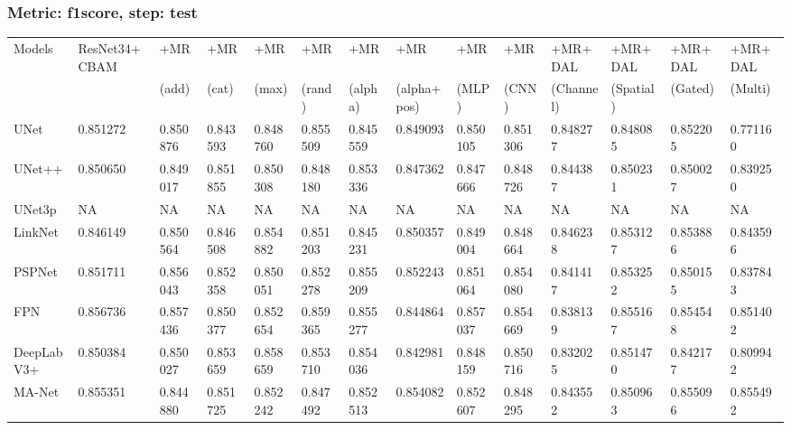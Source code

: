 \documentclass{article}
\begin{document}
\subsubsection{Metric: f1score, step: test}
\begin{tabular}{llllllllllllll}
\toprule
Models & ResNet34+CBAM & +MR  & +MR  & +MR  & +MR  & +MR  & +MR  & +MR  & +MR  & +MR+DAL & +MR+DAL & +MR+DAL & +MR+DAL \\
       &             &  (add) &  (cat) &  (max) &  (rand) &  (alpha) &  (alpha+pos) &  (MLP) &  (CNN) & (Channel) & (Spatial) & (Gated) & (Multi) \\
\midrule
UNet & 0.851272 & 0.850876 & 0.843593 & 0.848760 & 0.855509 & 0.845559 & 0.849093 & 0.850105 & 0.851306 & 0.848277 & 0.848085 & 0.852205 & 0.771160 \\
UNet++ & 0.850650 & 0.849017 & 0.851855 & 0.850308 & 0.848180 & 0.853336 & 0.847362 & 0.847666 & 0.848726 & 0.844387 & 0.850231 & 0.850027 & 0.839250 \\
UNet3p & NA & NA & NA & NA & NA & NA & NA & NA & NA & NA & NA & NA & NA \\
LinkNet & 0.846149 & 0.850564 & 0.846508 & 0.854882 & 0.851203 & 0.845231 & 0.850357 & 0.849004 & 0.848664 & 0.846238 & 0.853127 & 0.853886 & 0.843596 \\
PSPNet & 0.851711 & 0.856043 & 0.852358 & 0.850051 & 0.852278 & 0.855209 & 0.852243 & 0.851064 & 0.854080 & 0.841417 & 0.853252 & 0.850155 & 0.837843 \\
FPN & 0.856736 & 0.857436 & 0.850377 & 0.852654 & 0.859365 & 0.855277 & 0.844864 & 0.857037 & 0.854669 & 0.838139 & 0.855167 & 0.854548 & 0.851402 \\
DeepLabV3+ & 0.850384 & 0.850027 & 0.853659 & 0.858659 & 0.853710 & 0.854036 & 0.842981 & 0.848159 & 0.850716 & 0.832025 & 0.851470 & 0.842177 & 0.809942 \\
MA-Net & 0.855351 & 0.844880 & 0.851725 & 0.852242 & 0.847492 & 0.852513 & 0.854082 & 0.852607 & 0.848295 & 0.843552 & 0.850963 & 0.855096 & 0.855492 \\
\bottomrule
\end{tabular}
\end{document}
